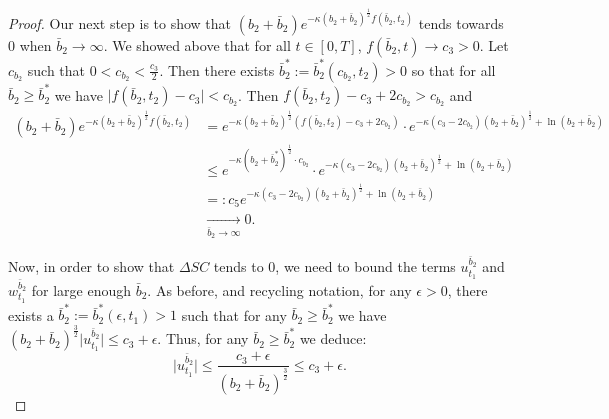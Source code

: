 \documentclass[11pt]{article}
\begin{document}
\begin{proof}
	
	Our next step is to show that $(b_2 + \bar{b}_2) e^{- \kappa (b_2 + \bar{b}_2)^{\frac{1}{2}} f(\bar{b}_2,t_2) } $ tends towards $0$ when $\bar{b}_2 \to \infty$. We showed above that for all $t \in [0,T]$, $f(\bar{b}_2,t) \to c_3 >0$. Let $c_{b_2}$ such that $0<c_{b_2} <\frac{c_3}{2} $. Then there exists $\bar{b}_2^* := \bar{b}_2^*(c_{b_2},t_2)>0$ so that for all $\bar{b}_2 \geq \bar{b}_2^*$ we have $\vert f(\bar{b}_2,t_2) - c_3 \vert < c_{b_2}$. Then $f(\bar{b}_2,t_2) - c_3 + 2c_{b_2} > c_{b_2}$ and 
	\begin{equation*}
	\begin{array}{rl}
		(b_2 + \bar{b}_2) e^{- \kappa (b_2 + \bar{b}_2)^{\frac{1}{2}} f(\bar{b}_2,t_2) }  &= e^{- \kappa (b_2 + \bar{b}_2)^{\frac{1}{2}} (f(\bar{b}_2,t_2) - c_3 + 2c_{b_2}) }\cdot e^{- \kappa  (c_3 - 2 c_{b_2}) (b_2 + \bar{b}_2)^{\frac{1}{2}} +  \ln (b_2 + \bar{b}_2) } \\
		& \leq  e^{- \kappa (b_2+\bar{b}_2^*)^{\frac{1}{2}} \cdot c_{b_2}} \cdot e^{- \kappa (c_3 - 2 c_{b_2}) (b_2 + \bar{b}_2)^{\frac{1}{2}} + \ln (b_2 + \bar{b}_2)} \\
		&=:c_5 e^{- \kappa (c_3 - 2 c_{b_2}) (b_2 + \bar{b}_2)^{\frac{1}{2}} + \ln (b_2 + \bar{b}_2)} \\
		& \xrightarrow[\bar{b}_2 \to \infty]{}0.
	\end{array}
	\end{equation*}
 	
 	
 	Now, in order to show that $\Delta SC$ tends to $0$, we need to bound the terms $u_{t_1}^{\bar{b}_2}$ and $w_{t_1}^{\bar{b}_2}$ for large enough $\bar{b}_2$. As before, and recycling notation, for any $\epsilon>0$, there exists a $\bar{b}_2^*:=\bar{b}_2^*(\epsilon,t_1) > 1$ such that for any $\bar{b}_2 \geq \bar{b}_2^*$ we have $ (b_2 + \bar{b}_2)^{\frac{3}{2}} \vert u_{t_1}^{\bar{b}_2} \vert \leq c_3 + \epsilon$. Thus, for any $\bar{b}_2 \geq \bar{b}_2^*$ we deduce:
 	$$ \vert u_{t_1}^{\bar{b}_2} \vert \leq \frac{c_3 + \epsilon}{(b_2 + \bar{b}_2)^{\frac{3}{2}} } \leq c_3 + \epsilon.
 	$$
 		

\end{proof}
\end{document}
